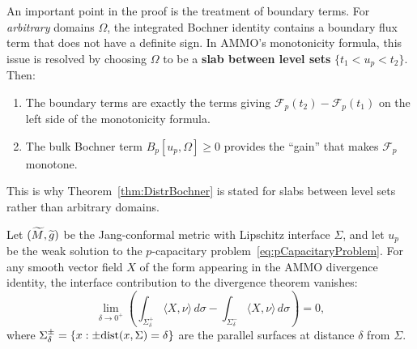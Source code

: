 \begin{remark}\label{rem:BoundaryTerms}
An important point in the proof is the treatment of boundary terms. For \emph{arbitrary} domains $\Omega$, the integrated Bochner identity contains a boundary flux term that does not have a definite sign. In AMMO's monotonicity formula, this issue is resolved by choosing $\Omega$ to be a \textbf{slab between level sets} $\{t_1 < u_p < t_2\}$. Then:
\begin{enumerate}
    \item The boundary terms are exactly the terms giving $\mathcal{F}_p(t_2) - \mathcal{F}_p(t_1)$ on the left side of the monotonicity formula.
    \item The bulk Bochner term $B_p[u_p, \Omega] \ge 0$ provides the ``gain'' that makes $\mathcal{F}_p$ monotone.
\end{enumerate}
This is why Theorem~\ref{thm:DistrBochner} is stated for slabs between level sets rather than arbitrary domains.
\end{remark}

\begin{lemma}\label{lem:InterfaceFluxVanishing}
Let $(\widetilde{M}, \widetilde{g})$ be the Jang-conformal metric with Lipschitz interface $\Sigma$, and let $u_p$ be the weak solution to the $p$-capacitary problem~\eqref{eq:pCapacitaryProblem}. For any smooth vector field $X$ of the form appearing in the AMMO divergence identity, the interface contribution to the divergence theorem vanishes:
\begin{equation}
    \lim_{\delta \to 0^+} \left( \int_{\Sigma^+_\delta} \langle X, \nu \rangle \, d\sigma - \int_{\Sigma^-_\delta} \langle X, \nu \rangle \, d\sigma \right) = 0,
\end{equation}
where $\Sigma^\pm_\delta = \{x : \pm \mathrm{dist}(x, \Sigma) = \delta\}$ are the parallel surfaces at distance $\delta$ from $\Sigma$.
\end{lemma}

